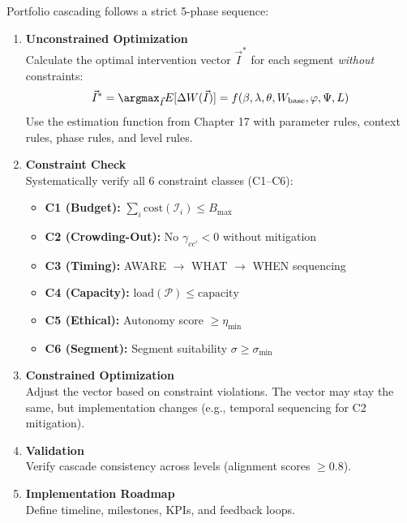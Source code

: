 Portfolio cascading follows a strict 5-phase sequence:

\begin{enumerate}[label=\textbf{Phase \arabic*:}, leftmargin=3em]
    \item \textbf{Unconstrained Optimization} \\
    Calculate the optimal intervention vector $\vec{I}^*$ for each segment \emph{without} constraints:
    \begin{equation}
    \vec{I}^* = \argmax_{\vec{I}} E[\Delta W(\vec{I})] = f(\beta, \lambda, \theta, W_{\text{base}}, \varphi, \Psi, L)
    \label{eq:unconstrained-opt}
    \end{equation}
    Use the estimation function from Chapter 17 with parameter rules, context rules, phase rules, and level rules.

    \item \textbf{Constraint Check} \\
    Systematically verify all 6 constraint classes (C1--C6):
    \begin{itemize}[nosep]
        \item \textbf{C1 (Budget):} $\sum_i \text{cost}(\mathcal{I}_i) \leq B_{\max}$
        \item \textbf{C2 (Crowding-Out):} No $\gamma_{cc'} < 0$ without mitigation
        \item \textbf{C3 (Timing):} AWARE $\rightarrow$ WHAT $\rightarrow$ WHEN sequencing
        \item \textbf{C4 (Capacity):} $\text{load}(\mathcal{P}) \leq \text{capacity}$
        \item \textbf{C5 (Ethical):} Autonomy score $\geq \eta_{\min}$
        \item \textbf{C6 (Segment):} Segment suitability $\sigma \geq \sigma_{\min}$
    \end{itemize}

    \item \textbf{Constrained Optimization} \\
    Adjust the vector based on constraint violations. The vector may stay the same,
    but implementation changes (e.g., temporal sequencing for C2 mitigation).

    \item \textbf{Validation} \\
    Verify cascade consistency across levels (alignment scores $\geq 0.8$).

    \item \textbf{Implementation Roadmap} \\
    Define timeline, milestones, KPIs, and feedback loops.
\end{enumerate}

